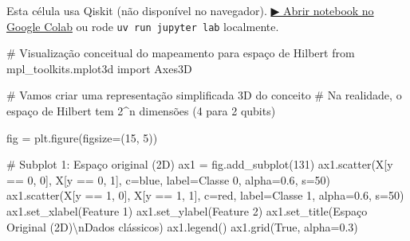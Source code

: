 \documentclass[
  brazilian,
]{report}
\newenvironment{Shaded}{\begin{snugshade}}{\end{snugshade}}
\newcommand{\CharTok}[1]{\textcolor[rgb]{0.13,0.47,0.30}{#1}}
\newcommand{\CommentTok}[1]{\textcolor[rgb]{0.37,0.37,0.37}{#1}}
\newcommand{\DecValTok}[1]{\textcolor[rgb]{0.68,0.00,0.00}{#1}}
\newcommand{\FloatTok}[1]{\textcolor[rgb]{0.68,0.00,0.00}{#1}}
\newcommand{\ImportTok}[1]{\textcolor[rgb]{0.00,0.46,0.62}{#1}}
\newcommand{\NormalTok}[1]{\textcolor[rgb]{0.00,0.23,0.31}{#1}}
\newcommand{\OperatorTok}[1]{\textcolor[rgb]{0.37,0.37,0.37}{#1}}
\newcommand{\StringTok}[1]{\textcolor[rgb]{0.13,0.47,0.30}{#1}}
\newcommand{\VariableTok}[1]{\textcolor[rgb]{0.07,0.07,0.07}{#1}}
\begin{document}
\begin{tcolorbox}[enhanced jigsaw, arc=.35mm, bottomrule=.15mm, bottomtitle=1mm, breakable, colback=white, colbacktitle=quarto-callout-warning-color!10!white, colframe=quarto-callout-warning-color-frame, coltitle=black, left=2mm, leftrule=.75mm, opacityback=0, opacitybacktitle=0.6, rightrule=.15mm, title=\textcolor{quarto-callout-warning-color}{\faExclamationTriangle}\hspace{0.5em}{⚛️ Célula Qiskit --- execute no Colab ou localmente}, titlerule=0mm, toprule=.15mm, toptitle=1mm]

Esta célula usa Qiskit (não disponível no navegador).
\href{https://colab.research.google.com/github/maxwellamaral/aula-quantum/blob/main/notebooks/20-quantum-machine-learning.ipynb}{▶
Abrir notebook no Google Colab} ou rode \texttt{uv\ run\ jupyter\ lab}
localmente.

\begin{Shaded}
\begin{Highlighting}[]

\CommentTok{\# Visualização conceitual do mapeamento para espaço de Hilbert}
\ImportTok{from}\NormalTok{ mpl\_toolkits.mplot3d }\ImportTok{import}\NormalTok{ Axes3D}

\CommentTok{\# Vamos criar uma representação simplificada 3D do conceito}
\CommentTok{\# Na realidade, o espaço de Hilbert tem 2\^{}n dimensões (4 para 2 qubits)}

\NormalTok{fig }\OperatorTok{=}\NormalTok{ plt.figure(figsize}\OperatorTok{=}\NormalTok{(}\DecValTok{15}\NormalTok{, }\DecValTok{5}\NormalTok{))}

\CommentTok{\# Subplot 1: Espaço original (2D)}
\NormalTok{ax1 }\OperatorTok{=}\NormalTok{ fig.add\_subplot(}\DecValTok{131}\NormalTok{)}
\NormalTok{ax1.scatter(X[y }\OperatorTok{==} \DecValTok{0}\NormalTok{, }\DecValTok{0}\NormalTok{], X[y }\OperatorTok{==} \DecValTok{0}\NormalTok{, }\DecValTok{1}\NormalTok{], c}\OperatorTok{=}\StringTok{\textquotesingle{}blue\textquotesingle{}}\NormalTok{, label}\OperatorTok{=}\StringTok{\textquotesingle{}Classe 0\textquotesingle{}}\NormalTok{, alpha}\OperatorTok{=}\FloatTok{0.6}\NormalTok{, s}\OperatorTok{=}\DecValTok{50}\NormalTok{)}
\NormalTok{ax1.scatter(X[y }\OperatorTok{==} \DecValTok{1}\NormalTok{, }\DecValTok{0}\NormalTok{], X[y }\OperatorTok{==} \DecValTok{1}\NormalTok{, }\DecValTok{1}\NormalTok{], c}\OperatorTok{=}\StringTok{\textquotesingle{}red\textquotesingle{}}\NormalTok{, label}\OperatorTok{=}\StringTok{\textquotesingle{}Classe 1\textquotesingle{}}\NormalTok{, alpha}\OperatorTok{=}\FloatTok{0.6}\NormalTok{, s}\OperatorTok{=}\DecValTok{50}\NormalTok{)}
\NormalTok{ax1.set\_xlabel(}\StringTok{\textquotesingle{}Feature 1\textquotesingle{}}\NormalTok{)}
\NormalTok{ax1.set\_ylabel(}\StringTok{\textquotesingle{}Feature 2\textquotesingle{}}\NormalTok{)}
\NormalTok{ax1.set\_title(}\StringTok{\textquotesingle{}Espaço Original (2D)}\CharTok{\textbackslash{}n}\StringTok{Dados clássicos\textquotesingle{}}\NormalTok{)}
\NormalTok{ax1.legend()}
\NormalTok{ax1.grid(}\VariableTok{True}\NormalTok{, alpha}\OperatorTok{=}\FloatTok{0.3}\NormalTok{)}


\end{Highlighting}
\end{Shaded}
\end{tcolorbox}
\end{document}
